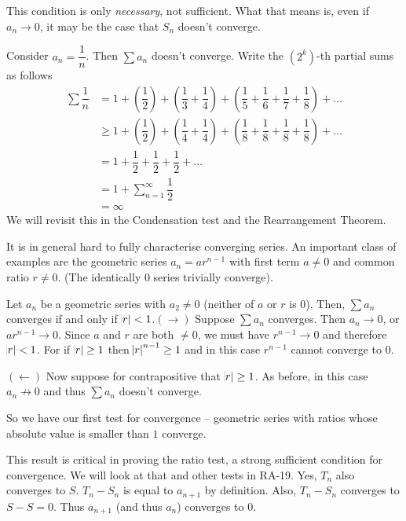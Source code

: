 This condition is only \textit{necessary}, not sufficient. What that means is, even if $a_n \rightarrow 0$, it may be the case that $S_n$ doesn't converge.

\begin{SNP}{\xmp}Consider $a_n = \dfrac{1}{n}$. Then $\sum a_n$ doesn't converge. Write the $(2^k)$-th partial sums as follows
\begin{align*}
\sum\dfrac1 n&= 1 + \left(\dfrac1 2\right) + \left(\dfrac 1 3 + \dfrac 1 4\right) + \left(\dfrac 1 5 + \dfrac 1 6 + \dfrac 1 7 + \dfrac 1 8\right) + \ldots\\
&\geq 1 + \left(\dfrac1 2\right) + \left(\dfrac 1 4 + \dfrac 1 4\right) + \left(\dfrac1 8 + \dfrac1 8 + \dfrac1 8 + \dfrac1 8\right) + \ldots\\
&= 1 + \dfrac1 2 + \dfrac 1 2 + \dfrac1 2 + \ldots\\
&= 1 + \sum\limits_{n = 1}^{\infty}\dfrac1 2\\
&= \infty
\end{align*}
We will revisit this in the Condensation test and the Rearrangement Theorem.
\end{SNP}
It is in general hard to fully characterise converging series. An important class of examples are the geometric series $a_n = ar^{n - 1}$ with first term $a \neq 0$ and common ratio $r \neq 0$. (The identically $0$ series trivially converge).

\begin{SWP}{\thm}{Let $a_n$ be a geometric series with $a_2 \neq 0$ (neither of $a$ or $r$ is $0$). Then, $\sum a_n$ converges if and only if $\abs{r} < 1$.}$(\rightarrow)$ Suppose $\sum a_n$ converges. Then $a_n \rightarrow 0$, or $ar^{n - 1} \rightarrow 0$. Since $a$ and $r$ are both $\neq 0$, we must have $r^{n - 1} \to 0$ and therefore $\abs{r} < 1$. For if $\abs{r} \geq 1$ then $\abs r^{n - 1} \geq 1$ and in this case $r^{n - 1}$ cannot converge to $0$.

$(\leftarrow)$ Now suppose for contrapositive that $\abs r \geq 1$. As before, in this case $a_n \not \to 0$ and thus $\sum a_n$ doesn't converge.
\end{SWP}

So we have our first test for convergence -- geometric series with ratios whose absolute value is smaller than $1$ converge.

This result is critical in proving the ratio test, a strong sufficient condition for convergence. We will look at that and other tests in RA-19.
\AnswerSection
\ans Yes, $T_n$ also converges to $S$. $T_n - S_n$ is equal to $a_{n + 1}$ by definition. Also, $T_n - S_n$ converges to $S - S = 0$. Thus $a_{n + 1}$ (and thus $a_n$) converges to $0$.
